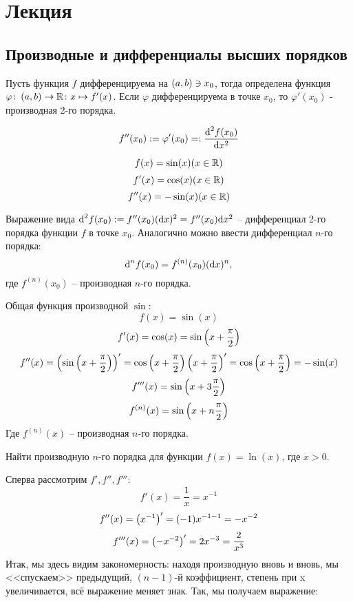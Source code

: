 \section{Лекция}
\subsection{Производные и дифференциалы высших порядков}
\begin{definition}
    Пусть функция \( f \) дифференцируема на \( \left( a, b \right) \ni x_0 \), тогда определена функция \( \varphi\colon \left( a, b \right) \to \mathbb{R} \colon x \mapsto f'(x) \). Если \( \varphi \) дифференцируема в точке \( x_0 \), то \( \varphi'(x_0) \) - производная 2-го порядка.
\end{definition}
\begin{dsg} 
    \[ f''(x_0) := \varphi'(x_0) =: \frac{\text{d}^2f(x_0)}{\text{d} x^2}\]
\end{dsg}
\begin{example}
    \[ f(x)  = \sin(x) (x \in \mathbb{R}) \]
    \[ f'(x) = \cos(x) (x \in \mathbb{R}) \]
    \[ f''(x)=-\sin(x) (x \in \mathbb{R}) \]
\end{example}
\begin{definition} 
    Выражение вида \( \text{d}^2f(x_0) := f''(x_0)(\text{d} x)^2 = f''(x_0)\text{d} x^2 \) -- дифференциал 2-го порядка функции \( f \) в точке \( x_0 \). Аналогично можно ввести дифференциал \( n \)-го порядка: 
    \[ \text{d}^nf(x_0) = f^{(n)}(x_0)(\text{d} x)^n, \]
    где \( f^{(n)}(x_0) \) -- производная \( n \)-го порядка.
\end{definition}
\begin{example} 
    Общая функция производной \( \sin \):
    \[ f(x) = \sin(x) \]
    \[ f'(x) = \cos(x) = \sin\left( x + \frac{\pi}{2} \right) \]
    \[ f''(x) = \left( \sin\left( x + \frac{\pi}{2} \right) \right)' = \cos\left( x + \frac{\pi}{2} \right)\left( x+\frac{\pi}{2} \right)' = \cos\left( x+\frac{\pi}{2} \right) = -\sin(x) \]
    \[ f'''(x) = \sin{\left( x + 3\frac{\pi}{2} \right)} \]
    \[ f^{(n)}(x)=\sin{\left( x+n\frac{\pi}{2} \right)} \]
    Где \( f^{(n)}(x) \) -- производная \( n \)-го порядка.
\end{example}
\begin{problem} 
    Найти производную \( n \)-го порядка для функции \( f(x) = \ln(x) \), где \( x > 0 \).
\end{problem}
Сперва рассмотрим \( f', f'', f''' \):
\[ f'(x) = \frac{1}{x} = x^{-1} \]
\[ f''(x) = \left( x^{-1} \right)' = (-1)x^{-1-1} = -x^{-2} \]
\[ f'''(x) = \left( -x^{-2} \right)' = 2x^{-3} = \frac{2}{x^3} \]
Итак, мы здесь видим закономерность: находя производную вновь и вновь, мы <<спускаем>> предыдущий, \( (n-1) \)-й коэффициент, степень при x увеличивается, всё выражение меняет знак. Так, мы получаем выражение:
